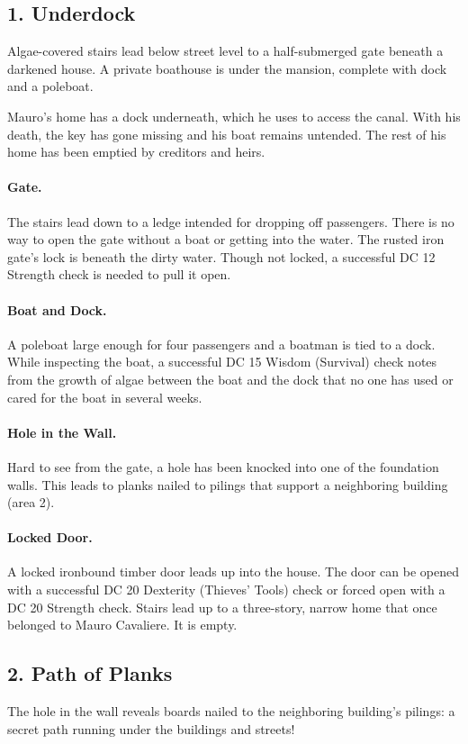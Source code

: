 \documentclass[10pt,a4paper,twoside,twocolumn,openany,bg=print,nodeprecatedcode]{dndbook}
\begin{document}
\subsection{1. Underdock}
\begin{DndReadAloud}{}
Algae-covered stairs lead below street level to a half-submerged gate beneath a darkened house. A private boathouse is under the mansion, complete with dock and a poleboat.
\end{DndReadAloud}

Mauro's home has a dock underneath, which he uses to access the canal. With his death, the key has gone missing and his boat remains untended. The rest of his home has been emptied by creditors and heirs.
\paragraph{Gate.}
The stairs lead down to a ledge intended for dropping off passengers. There is no way to open the gate without a boat or getting into the water. The rusted iron gate's lock is beneath the dirty water. Though not locked, a successful DC 12 Strength check is needed to pull it open.
\paragraph{Boat and Dock.}
A poleboat large enough for four passengers and a boatman is tied to a dock. While inspecting the boat, a successful DC 15 Wisdom (Survival) check notes from the growth of algae between the boat and the dock that no one has used or cared for the boat in several weeks.
\paragraph{Hole in the Wall.}
Hard to see from the gate, a hole has been knocked into one of the foundation walls. This leads to planks nailed to pilings that support a neighboring building (area 2).
\paragraph{Locked Door.}
A locked ironbound timber door leads up into the house. The door can be opened with a successful DC 20 Dexterity (Thieves' Tools) check or forced open with a DC 20 Strength check. Stairs lead up to a three-story, narrow home that once belonged to Mauro Cavaliere. It is empty.
\subsection{2. Path of Planks}
\begin{DndReadAloud}{}
The hole in the wall reveals boards nailed to the neighboring building's pilings: a secret path running under the buildings and streets!
\end{DndReadAloud}
\end{document}
